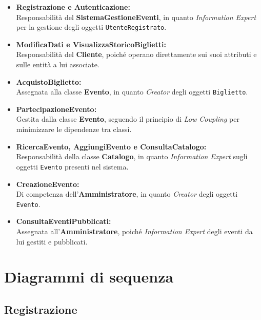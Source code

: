 \begin{itemize}
    \item \textbf{Registrazione e Autenticazione:} \\
    Responsabilità del \textbf{SistemaGestioneEventi}, in quanto \emph{Information Expert} per la gestione degli oggetti \texttt{UtenteRegistrato}.
    
    \item \textbf{ModificaDati e VisualizzaStoricoBiglietti:} \\
    Responsabilità del \textbf{Cliente}, poiché operano direttamente sui suoi attributi e sulle entità a lui associate.
    
    \item \textbf{AcquistoBiglietto:} \\
    Assegnata alla classe \textbf{Evento}, in quanto \emph{Creator} degli oggetti \texttt{Biglietto}.
    
    \item \textbf{PartecipazioneEvento:} \\
    Gestita dalla classe \textbf{Evento}, seguendo il principio di \emph{Low Coupling} per minimizzare le dipendenze tra classi.
    
    \item \textbf{RicercaEvento, AggiungiEvento e ConsultaCatalogo:} \\
    Responsabilità della classe \textbf{Catalogo}, in quanto \emph{Information Expert} sugli oggetti \texttt{Evento} presenti nel sistema.
    
    \item \textbf{CreazioneEvento:} \\
    Di competenza dell'\textbf{Amministratore}, in quanto \emph{Creator} degli oggetti \texttt{Evento}.
    
    \item \textbf{ConsultaEventiPubblicati:} \\
    Assegnata all'\textbf{Amministratore}, poiché \emph{Information Expert} degli eventi da lui gestiti e pubblicati.
\end{itemize}

\newpage

\section{Diagrammi di sequenza}
\subsection{Registrazione}

